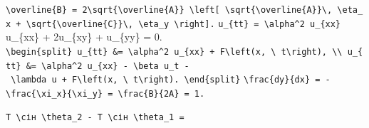 \documentclass[
  ukrainian,
]{article}
\begin{document}
\texttt{\textbackslash{}overline\{B\}\ =\ 2\textbackslash{}sqrt\{\textbackslash{}overline\{A\}\}\ \textbackslash{}left{[}\ \textbackslash{}sqrt\{\textbackslash{}overline\{A\}\}\textbackslash{},\ \textbackslash{}eta\_x\ +\ \textbackslash{}sqrt\{\textbackslash{}overline\{C\}\}\textbackslash{},\ \textbackslash{}eta\_y\ \textbackslash{}right{]}.}
\texttt{u\_\{tt\}\ =\ \textbackslash{}alpha\^{}2\ u\_\{xx\}} u\_\{xx\} +
2u\_\{xy\} + u\_\{yy\} = 0.
\texttt{\textbackslash{}begin\{split\}\ u\_\{tt\}\ \&=\ \textbackslash{}alpha\^{}2\ u\_\{xx\}\ +\ F\textbackslash{}left(x,\ \textbackslash{}\ t\textbackslash{}right),\ \textbackslash{}\textbackslash{}\ u\_\{tt\}\ \&=\ \textbackslash{}alpha\^{}2\ u\_\{xx\}\ -\ \textbackslash{}beta\ u\_t\ -\ \textbackslash{}lambda\ u\ +\ F\textbackslash{}left(x,\ \textbackslash{}\ t\textbackslash{}right).\ \textbackslash{}end\{split\}}
\texttt{\textbackslash{}frac\{dy\}\{dx\}\ =\ -\textbackslash{}frac\{\textbackslash{}xi\_x\}\{\textbackslash{}xi\_y\}\ =\ \textbackslash{}frac\{B\}\{2A\}\ =\ 1.}

\begin{verbatim}
Т \сін \theta_2 - Т \сін \theta_1 =
\end{verbatim}
\end{document}
